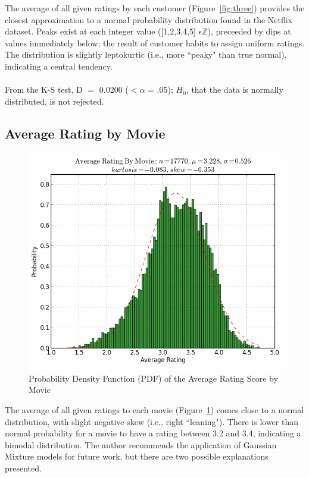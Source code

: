 \documentclass{acmtog}
\begin{document}
The average of all given ratings by each customer (Figure~\ref{fig:three}) provides the closest approximation to a normal probability distribution found in the Netflix dataset. Peaks exist at each integer value ([1,2,3,4,5] $\epsilon \mathbb{Z}$), preceeded by dips at values immediately below; the result of customer habits to assign uniform ratings. The distribution is slightly leptokurtic (i.e., more ``peaky" than true normal), indicating a central tendency.
\\
\\
From the K-S test, D $=$ 0.0200  ($<\alpha$ = .05); $H_0$, that the data is normally distributed, is not rejected.


\subsection{Average Rating by Movie}

\begin{figure}
\centerline{\includegraphics[scale=.45]{average_rating_by_movie.png}}
\caption{Probability Density Function (PDF) of the Average Rating Score by Movie}
\label{fig:four}
\end{figure}

The average of all given ratings to each movie (Figure~\ref{fig:four}) comes close to a normal distribution, with slight negative skew (i.e., right ``leaning"). There is lower than normal probability for a movie to have a rating between 3.2 and 3.4, indicating a bimodal distribution. The author recommends the application of Gaussian Mixture models for future work, but there are two possible explanations presented.
\end{document}
